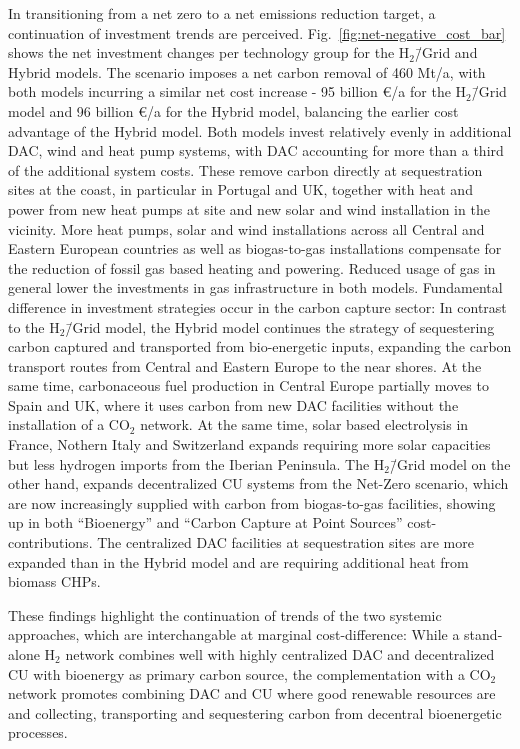 \documentclass[twocolumn]{article}
\newcommand{\COtwo}{CO$_2$}
\newcommand{\Htwo}{H$_2$}
\newcommand{\Hgrid}{H$_2$\=/Grid}
\newcommand{\modH}{H$_2$\=/Grid model}
\newcommand{\modHybrid}{Hybrid model}
\begin{document}
In transitioning from a net zero to a net emissions reduction target, a continuation of investment trends are perceived. Fig.~\ref{fig:net-negative_cost_bar} shows the net investment changes per technology group for the \Hgrid{} and \modHybrid{}s. The scenario imposes a net carbon removal of 460 Mt/a, with both models incurring a similar net cost increase - 95 billion €/a for the \modH{} and 96 billion €/a for the \modHybrid{}, balancing the earlier cost advantage of the \modHybrid{}. Both models invest relatively evenly in additional DAC, wind and heat pump systems, with DAC accounting for more than a third of the additional system costs. These remove carbon directly at sequestration sites at the coast, in particular in Portugal and UK, together with heat and power from new heat pumps at site and new solar and wind installation in the vicinity.
More heat pumps, solar and wind installations across all Central and Eastern European countries as well as biogas-to-gas installations compensate for the reduction of fossil gas based heating and powering. Reduced usage of gas in general lower the investments in gas infrastructure in both models.
Fundamental difference in investment strategies occur in the carbon capture sector: In contrast to the \modH{}, the \modHybrid{} continues the strategy of sequestering carbon captured and transported from bio-energetic inputs, expanding the carbon transport routes from Central and Eastern Europe to the near shores. At the same time, carbonaceous fuel production in Central Europe partially moves to Spain and UK, where it uses carbon from new DAC facilities without the installation of a \COtwo{} network. At the same time, solar based electrolysis in France, Nothern Italy and Switzerland expands requiring more solar capacities but less hydrogen imports from the Iberian Peninsula.
The \modH{} on the other hand, expands decentralized CU systems from the Net-Zero scenario, which are now increasingly supplied with carbon from biogas-to-gas facilities, showing up in both ``Bioenergy'' and ``Carbon Capture at Point Sources'' cost-contributions. The centralized DAC facilities at sequestration sites are more expanded than in the \modHybrid{} and are requiring additional heat from biomass CHPs.


These findings highlight the continuation of trends of the two systemic approaches, which are interchangable at marginal cost-difference: While a stand-alone \Htwo{} network combines well with highly centralized DAC and decentralized CU with bioenergy as primary carbon source, the complementation with a \COtwo{} network promotes combining DAC and CU where good renewable resources are and collecting, transporting and sequestering carbon from decentral bioenergetic processes.
\end{document}
